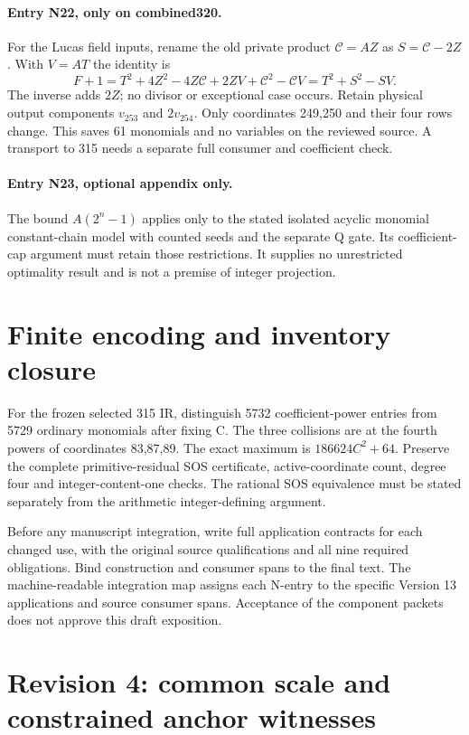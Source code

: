 \documentclass{article}
\begin{document}
\paragraph{Entry N22, only on combined320.}
For the Lucas field inputs, rename the old private product $\mathcal C=AZ$
as $S=\mathcal C-2Z$. With $V=AT$ the identity is
\[
 F+1=T^2+4Z^2-4Z\mathcal C+2ZV+\mathcal C^2-\mathcal CV
     =T^2+S^2-SV.
\]
The inverse adds $2Z$; no divisor or exceptional case occurs. Retain
physical output components $v_{253}$ and $2v_{254}$. Only coordinates
249,250 and their four rows change. This saves 61 monomials and no
variables on the reviewed source. A transport to 315 needs a separate
full consumer and coefficient check.

\paragraph{Entry N23, optional appendix only.}
The bound $A(2^n-1)$ applies only to the stated isolated acyclic monomial
constant-chain model with counted seeds and the separate Q gate. Its
coefficient-cap argument must retain those restrictions. It supplies no
unrestricted optimality result and is not a premise of integer projection.

\section{Finite encoding and inventory closure}
\label{outline:finite}
For the frozen selected 315 IR, distinguish 5732 coefficient-power entries
from 5729 ordinary monomials after fixing C. The three collisions are
at the fourth powers of coordinates 83,87,89. The exact maximum is
$186624C^2+64$. Preserve the complete primitive-residual SOS certificate,
active-coordinate count, degree four and integer-content-one checks.
The rational SOS equivalence must be stated separately from the arithmetic
integer-defining argument.

Before any manuscript integration, write full application contracts for
each changed use, with the original source qualifications and all nine
required obligations. Bind construction and consumer spans to the final
text. The machine-readable integration map assigns each N-entry to the
specific Version 13 applications and source consumer spans. Acceptance
of the component packets does not approve this draft exposition.
\section{Revision 4: common scale and constrained anchor witnesses}
\end{document}

